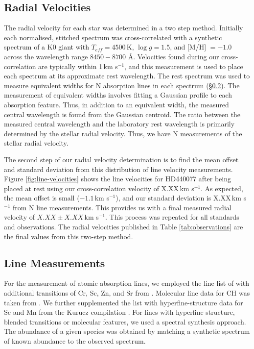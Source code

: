 \documentclass{emulateapj}
\begin{document}
\subsection{Radial Velocities}
\label{sec:radial-velocities}
The radial velocity for each star was determined in a two step method. Initially each normalised, stitched spectrum was cross-correlated with a synthetic spectrum of a K0 giant with $T_{eff} = 4500$\,K, $\log{g} = 1.5$, and [M/H] $= -1.0$ across the wavelength range $8450 - 8700$ \AA{}. Velocities found during our cross-correlation are typically within 1\,km s$^{-1}$, and this measurement is used to place each spectrum at its approximate rest wavelength. The rest spectrum was used to measure equivalent widths for N absorption lines in each spectrum (\S\ref{sec:line-measurements}). The measurement of equivalent widths involves fitting a Gaussian profile to each absorption feature. Thus, in addition to an equivalent width, the measured central wavelength is found from the Gaussian centroid. The ratio between the measured central wavelength and the laboratory rest wavelength is primarily determined by the stellar radial velocity. Thus, we have N measurements of the stellar radial velocity. 

The second step of our radial velocity determination is to find the mean offset and standard deviation from this distribution of line velocity measurements. Figure \ref{fig:line-velocities} shows the line velocities for HD440077 after  being placed at rest using our cross-correlation velocity of X.XX\,km s$^{-1}$. As expected, the mean offset is small ($-1.1$\,km s$^{-1}$), and our standard deviation is X.XX\,km s$^{-1}$ from N line measurements. This provides us with a final measured radial velocity of $X.XX \pm X.XX$\,km s$^{-1}$. This process was repeated for all standards and observations. The radial velocities published in Table \ref{tab:observations} are the final values from this two-step method. 

\subsection{Line Measurements}
\label{sec:line-measurements}

For the measurement of atomic absorption lines, we employed the line list of \citet{Yong;et-al_2009} with additional transitions of Cr, Sc, Zn, and Sr from \citet{Frebel;et-al_2009}. Molecular line data for CH was taken from \citet{Plez;et-al_2008,Plez;et-al_2009}. We further supplemented the list with hyperfine-structure data for Sc and Mn  from the Kurucz compilation \citet{Kurucz;1998}. For lines with hyperfine structure, blended transitions or molecular features, we used a spectral synthesis approach. The abundance of a given species was obtained by matching a synthetic spectrum of known abundance to the observed spectrum.
\end{document}
